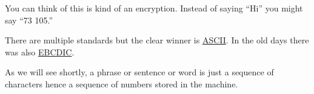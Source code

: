 \documentclass[titlepage]{tufte-book}
\begin{document}
\begin{fullwidth}

You can think of this is kind of an encryption. Instead of saying ``Hi'' you might say ``73 105.''
 
There are multiple standards but the clear winner is \href{http://www.asciitable.com/}{ASCII}. In the old days there was also \href{http://www.lookuptables.com/ebcdic_scancodes.php}{EBCDIC}.

As we will see shortly, a phrase or sentence or word is just a sequence of characters hence a sequence of numbers stored in the machine.


\end{fullwidth}
\end{document}
